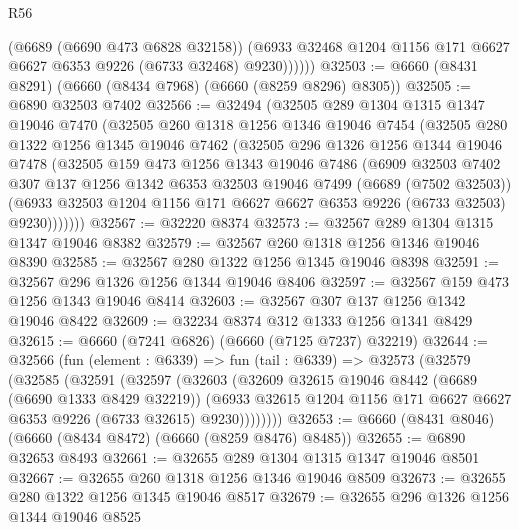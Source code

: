 \begin{lexlean}{R56}
\begin{coremodule}
              (@6689 (@6690 @473 @6828 @32158))
              (@6933 @32468 @1204 @1156 @171 @6627 @6627 @6353 @9226 (@6733 @32468) @9230))))))
@32503 := @6660 (@8431 @8291) (@6660 (@8434 @7968) (@6660 (@8259 @8296) @8305))
@32505 := @6890 @32503 @7402
@32566 := @32494
    (@32505
      @289
      @1304
      @1315
      @1347
      @19046
      @7470
      (@32505
        @260
        @1318
        @1256
        @1346
        @19046
        @7454
        (@32505
          @280
          @1322
          @1256
          @1345
          @19046
          @7462
          (@32505
            @296
            @1326
            @1256
            @1344
            @19046
            @7478
            (@32505
              @159
              @473
              @1256
              @1343
              @19046
              @7486
              (@6909
                @32503
                @7402
                @307
                @137
                @1256
                @1342
                @6353
                @32503
                @19046
                @7499
                (@6689 (@7502 @32503))
                (@6933 @32503 @1204 @1156 @171 @6627 @6627 @6353 @9226 (@6733 @32503) @9230)))))))
@32567 := @32220 @8374
@32573 := @32567 @289 @1304 @1315 @1347 @19046 @8382
@32579 := @32567 @260 @1318 @1256 @1346 @19046 @8390
@32585 := @32567 @280 @1322 @1256 @1345 @19046 @8398
@32591 := @32567 @296 @1326 @1256 @1344 @19046 @8406
@32597 := @32567 @159 @473 @1256 @1343 @19046 @8414
@32603 := @32567 @307 @137 @1256 @1342 @19046 @8422
@32609 := @32234 @8374 @312 @1333 @1256 @1341 @8429
@32615 := @6660 (@7241 @6826) (@6660 (@7125 @7237) @32219)
@32644 := @32566
    (fun (element : @6339) =>
    fun (tail : @6339) =>
    @32573
      (@32579
        (@32585
          (@32591
            (@32597
              (@32603
                (@32609
                  @32615
                  @19046
                  @8442
                  (@6689 (@6690 @1333 @8429 @32219))
                  (@6933
                    @32615
                    @1204
                    @1156
                    @171
                    @6627
                    @6627
                    @6353
                    @9226
                    (@6733 @32615)
                    @9230))))))))
@32653 := @6660 (@8431 @8046) (@6660 (@8434 @8472) (@6660 (@8259 @8476) @8485))
@32655 := @6890 @32653 @8493
@32661 := @32655 @289 @1304 @1315 @1347 @19046 @8501
@32667 := @32655 @260 @1318 @1256 @1346 @19046 @8509
@32673 := @32655 @280 @1322 @1256 @1345 @19046 @8517
@32679 := @32655 @296 @1326 @1256 @1344 @19046 @8525

\end{coremodule}
\end{lexlean}
